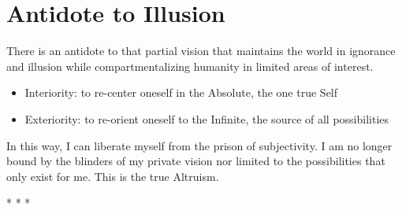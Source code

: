 \section{Antidote to Illusion}

There is an antidote to that partial vision that maintains the world in ignorance and illusion while compartmentalizing humanity in limited areas of interest.\\
{}


\begin{itemize}


\item Interiority: to re-center oneself in the Absolute, the one true Self

\item Exteriority: to re-orient oneself to the Infinite, the source of all possibilities
\end{itemize}


In this way, I can liberate myself from the prison of subjectivity. I am no longer bound by the blinders of my private vision nor limited to the possibilities that only exist for me. This is the true Altruism.



\begin{center}* * *\end{center}

